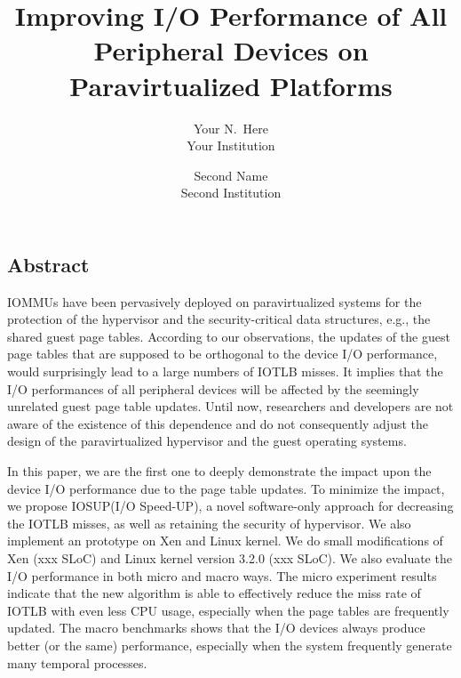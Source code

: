 \documentclass[letterpaper,twocolumn,10pt]{article}
\begin{document}
\newcommand{\name}{IOSUP\xspace}
\newcommand{\eat}[1]{}  %


\date{}

\title{\Large \bf Improving I/O Performance of All Peripheral Devices on Paravirtualized Platforms}

\author{
{\rm Your N.\ Here}\\
Your Institution
\and
{\rm Second Name}\\
Second Institution
} %

\maketitle

\thispagestyle{empty}


\subsection*{Abstract}

IOMMUs have been pervasively deployed on paravirtualized systems for the protection of the hypervisor and the security-critical data structures, e.g., the shared guest page tables. According to our observations, the updates of the guest page tables that are supposed to be orthogonal to the device I/O performance, would surprisingly lead to a large numbers of IOTLB misses. It implies that the I/O performances of all peripheral devices will be affected by the seemingly unrelated guest page table updates. Until now, researchers and developers are not aware of the existence of this dependence and do not consequently adjust the design of the paravirtualized hypervisor and the guest operating systems.

In this paper, we are the first one to deeply demonstrate the impact upon the device I/O performance due to the page table updates. To minimize the impact, we propose \name(I/O Speed-UP), a novel software-only approach for decreasing the IOTLB misses, as well as retaining the security of hypervisor.
We also implement an prototype on Xen and Linux kernel. We do small modifications of Xen (xxx SLoC) and Linux kernel version 3.2.0 (xxx SLoC). We also evaluate the I/O performance in both micro and macro ways. The micro experiment results indicate that the new algorithm is able to effectively reduce the miss rate of IOTLB with even less CPU usage, especially when the page tables are frequently updated. The macro benchmarks shows that the I/O devices always produce better (or the same) performance, especially when the system frequently generate many temporal processes.
\end{document}
